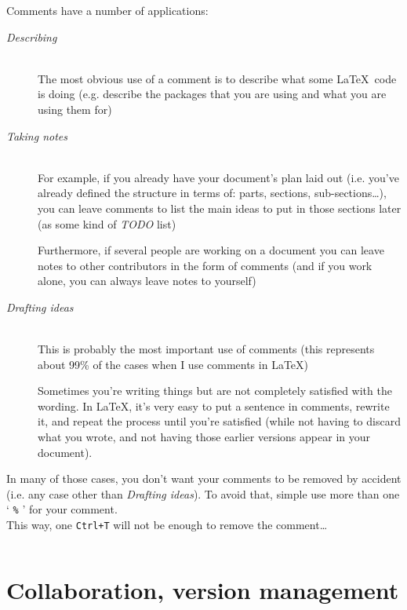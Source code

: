 Comments have a number of applications:

\begin{description}
	\item[\emph{Describing}] \mbox{}\\
	The most obvious use of a comment is to describe what some \LaTeX\ code is doing (e.g. describe the packages that you are using and what you are using them for)
	
	\item[\emph{Taking notes}] \mbox{}\\
	For example, if you already have your document's plan laid out (i.e. you've already defined the structure in terms of: parts, sections, sub-sections\ldots), you can leave comments to list the main ideas to put in those sections later (as some kind of \emph{TODO} list)
	
	Furthermore, if several people are working on a document you can leave notes to other contributors in the form of comments (and if you work alone, you can always leave notes to yourself)
	
	\item[\emph{Drafting ideas}] \mbox{}\\
	This is probably the most important use of comments (this represents about 99\% of the cases when I use comments in \LaTeX)
	
	Sometimes you're writing things but are not completely satisfied with the wording. In \LaTeX, it's very easy to put a sentence in comments, rewrite it, and repeat the process until you're satisfied (while not having to discard what you wrote, and not having those earlier versions appear in your document).
\end{description}


In many of those cases, you don't want your comments to be removed by accident (i.e. any case other than \emph{Drafting ideas}). To avoid that, simple use more than one ` \lstinline|%| ' for your comment. \\

This way, one \texttt{Ctrl+T} will not be enough to remove the comment\ldots
\begin{lstlisting}[language=tex]
%%% Packages and configuration
\end{lstlisting}


\bigskip


\section{Collaboration, version management}


